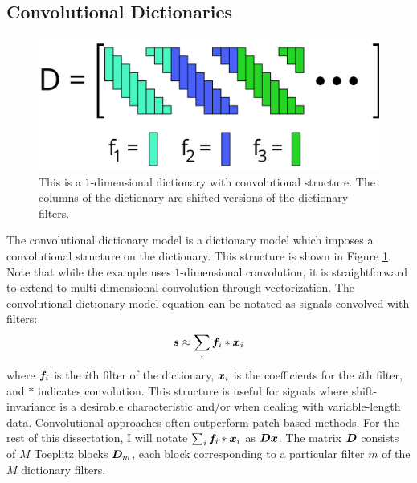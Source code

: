 \subsection{Convolutional Dictionaries}
\begin{figure}
	\includegraphics[width=\textwidth]{figures/convolutionalDictionary.png}
	\caption{This is a $1$-dimensional dictionary with convolutional structure. The columns of the dictionary are shifted versions of the dictionary filters.}
	\label{Figure: Convolutional Dictionary}
\end{figure}
The convolutional dictionary model is a dictionary model which imposes a convolutional structure on the dictionary. This structure is shown in Figure \ref{Figure: Convolutional Dictionary}. Note that while the example uses $1$-dimensional convolution, it is straightforward to extend to multi-dimensional convolution through vectorization. The convolutional dictionary model equation can be notated as signals convolved with filters:
%
\begin{equation}
\bm{s} \approx \sum_i \bm{f}_i * \bm{x}_i
\end{equation}
%
where $\bm{f}_i$ is the $i$th filter of the dictionary, $\bm{x}_i$ is the coefficients for the $i$th filter, and $*$ indicates convolution. This structure is useful for signals where shift-invariance is a desirable characteristic and/or when dealing with variable-length data. Convolutional approaches often outperform patch-based methods. For the rest of this dissertation, I will notate $\sum_i \bm{f}_i * \bm{x}_i$ as $\bm{D}\bm{x}$. The matrix $\bm{D}$ consists of $M$ Toeplitz blocks $\bm{D}_{m}$, each block corresponding to a particular filter $m$ of the $M$ dictionary filters.

